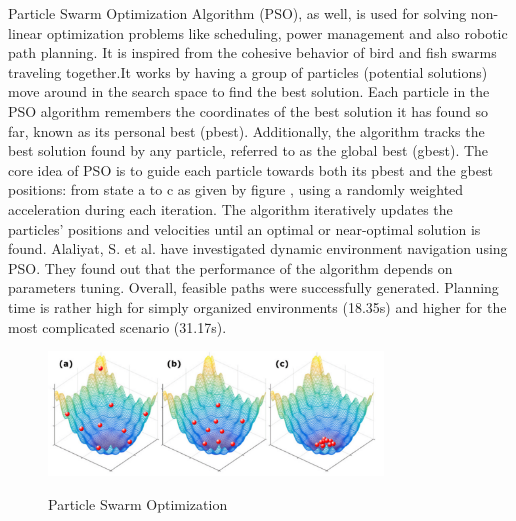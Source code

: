 Particle Swarm Optimization Algorithm (PSO), as well, is used for solving non-linear optimization problems like scheduling, power 
management and also robotic path planning. It is inspired from the cohesive behavior of bird and fish swarms traveling 
together.It works by having a group of particles (potential solutions) move around in the search space to find the best 
solution. Each particle in the PSO algorithm remembers the coordinates of the best solution it has found so far, known 
as its personal best (pbest). Additionally, the algorithm tracks the best solution found by any particle, referred to as 
the global best (gbest). The core idea of PSO is to guide each particle towards both its pbest and the gbest positions:
from state a to c as given by figure , 
using a randomly weighted acceleration during each iteration. The algorithm iteratively updates the particles' positions 
and velocities until an optimal or near-optimal solution is found.
Alaliyat, S. et al. have investigated dynamic environment navigation using PSO. They found out that the performance 
of the algorithm depends on parameters tuning. Overall, feasible paths were successfully generated.
Planning time is rather high for simply organized environments (18.35s) and higher for the most complicated scenario
(31.17s).

\begin{figure}[H]
    \begin{center}
        \includegraphics[width=3.5in]{images/Chap1/PSO.png}\\
        \caption{Particle Swarm Optimization \cite{R42}}
        \label{pso}
    \end{center}
\end{figure}

